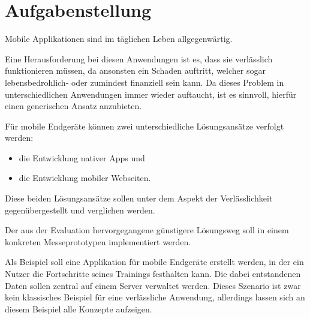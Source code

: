 \chapter*{Aufgabenstellung}
\label{cha:augabenstellung}

Mobile Applikationen sind im täglichen Leben allgegenwärtig.
 
Eine Herausforderung bei diesen Anwendungen ist es, dass sie verlässlich funktionieren müssen, da ansonsten ein Schaden auftritt, welcher sogar lebensbedrohlich- oder zumindest finanziell sein kann. Da dieses Problem in unterschiedlichen Anwendungen  immer wieder auftaucht, ist es sinnvoll, hierfür einen generischen Ansatz anzubieten. 

Für mobile Endgeräte können zwei unterschiedliche Lösungsansätze verfolgt werden: 
\begin{itemize}
\item die Entwicklung nativer Apps und
\item die Entwicklung mobiler Webseiten.
\end{itemize}
Diese beiden Lösungsansätze sollen unter dem Aspekt der Verlässlichkeit gegenübergestellt und verglichen werden.

Der aus der Evaluation hervorgegangene günstigere Lösungsweg soll in einem konkreten Messeprototypen implementiert werden.

Als Beispiel soll eine Applikation für mobile Endgeräte erstellt werden, in der ein Nutzer die Fortschritte seines Trainings festhalten kann. 
Die dabei entstandenen Daten sollen zentral auf einem Server verwaltet werden. 
Dieses Szenario ist zwar kein klassisches Beispiel für eine verlässliche Anwendung, allerdings lassen sich an diesem Beispiel alle Konzepte aufzeigen.

